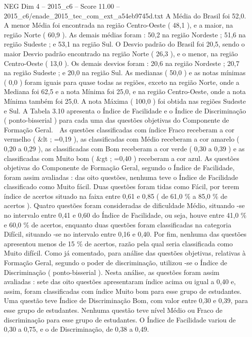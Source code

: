 \begin{textsample}{NEG Dim 4 – 2015\_c6 – Score 11.00 – 2015\_c6/enade\_2015\_tec\_com\_ext\_a54eb9745d.txt}
A Média do Brasil foi 52,0.
A menor Média foi encontrada na região Centro-Oeste ( 48,1 ), e a maior, na região Norte ( 60,9 ).
As demais médias foram : 50,2 na região Nordeste ; 51,6 na região Sudeste ; e 53,1 na região Sul.
O Desvio padrão do Brasil foi 20,5, sendo o maior Desvio padrão encontrado na região Norte ( 26,3 ), e o menor, na região Centro-Oeste ( 13,0 ).
Os demais desvios foram : 20,6 na região Nordeste ; 20,7 na região Sudeste ; e 20,0 na região Sul.
As medianas ( 50,0 ) e as notas mínimas ( 0,0 ) foram iguais para quase todas as regiões, exceto na região Norte, onde a Mediana foi 62,5 e a nota Mínima foi 25,0, e na região Centro-Oeste, onde a nota Mínima também foi 25,0.
A nota Máxima ( 100,0 ) foi obtida nas regiões Sudeste e Sul.
A Tabela 3.10 apresenta o Índice de Facilidade e o Índice de Discriminação ( ponto-bisserial ) para cada uma das questões objetivas do Componente de Formação Geral.  As questões classificadas com índice Fraco receberam a cor vermelho ( \&lt ; =0,19 ), as classificadas com Médio receberam a cor amarelo ( 0,20 a 0,29 ), as classificadas com Bom receberam a cor verde ( 0,30 a 0,39 ) e as classificadas com Muito bom ( \&gt ; =0,40 ) receberam a cor azul.
As questões objetivas do Componente de Formação Geral, segundo o Índice de Facilidade, foram assim avaliadas : das oito questões, nenhuma teve o Índice de Facilidade classificado como Muito fácil.
Duas questões foram tidas como Fácil, por terem índice de acertos situado na faixa entre 0,61 e 0,85 ( de 61,0 \% a 85,0 \% de acertos ).
Quatro questões foram consideradas de dificuldade Médio, situando -se no intervalo entre 0,41 e 0,60 do Índice de Facilidade, ou seja, houve entre 41,0 \% e 60,0 \% de acertos, enquanto duas questões foram classificadas na categoria Difícil, situando -se no intervalo entre 0,16 e 0,40.
Por fim, nenhuma das questões apresentou menos de 15 \% de acertos, razão pela qual seria classificada como Muito difícil.
Como já comentado, para análise das questões objetivas, relativas à Formação Geral, segundo o poder de discriminação, utilizou -se o Índice de Discriminação ( ponto-bisserial ).
Nesta análise, as questões foram assim avaliadas : sete das oito questões apresentaram índice acima ou igual a 0,40 e, assim, foram classificadas com índice Muito bom para esse grupo de estudantes.
Uma questão teve Índice de Discriminação Bom, com valor entre 0,30 e 0,39, para esse grupo de estudantes.
Nenhuma questão teve nível Médio ou Fraco de discriminação para esse grupo de estudantes.
O Índice de Facilidade variou de 0,30 a 0,75, e o de Discriminação, de 0,38 a 0,49.

\end{textsample}
